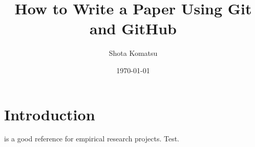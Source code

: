 \documentclass{article}
\title{How to Write a Paper Using Git and GitHub}
\author{Shota Komatsu}
\date{\today}
\begin{document}
\maketitle

\section{Introduction}

\citet{knittel2018working} is a good reference for empirical research projects. Test.



\end{document}
